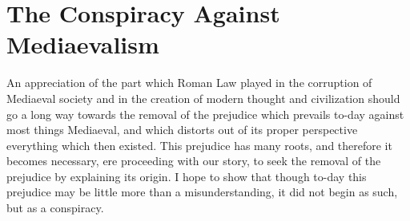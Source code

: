 \documentclass{book}
\begin{document}
\chapter{The Conspiracy Against Mediaevalism}
\label{chapter-6}
An appreciation of the part which Roman Law played in the corruption of Mediaeval society and in the creation of modern thought and civilization should go a long way towards the removal of the prejudice which prevails to-day against most things Mediaeval, and which distorts out of its proper perspective everything which then existed. This prejudice has many roots, and therefore it becomes necessary, ere proceeding with our story, to seek the removal of the prejudice by explaining its origin. I hope to show that though to-day this prejudice may be little more than a misunderstanding, it did not begin as such, but as a conspiracy.
\end{document}
